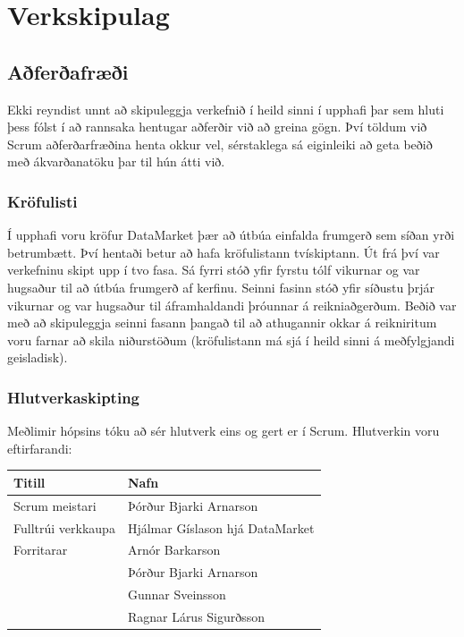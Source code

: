 \documentclass{article}
\begin{document}
\newpage

\section{Verkskipulag}


\subsection{Aðferðafræði}

Ekki reyndist unnt að skipuleggja verkefnið í heild sinni í upphafi þar sem hluti þess fólst í að rannsaka hentugar aðferðir við að greina gögn.
Því töldum við Scrum aðferðarfræðina henta okkur vel, sérstaklega sá eiginleiki að geta beðið með ákvarðanatöku þar til hún átti við.

\subsubsection{Kröfulisti}
Í upphafi voru kröfur DataMarket þær að útbúa einfalda frumgerð sem síðan yrði betrumbætt.
Því hentaði betur að hafa kröfulistann tvískiptann. Út frá því var verkefninu skipt upp í tvo fasa.
Sá fyrri stóð yfir fyrstu tólf vikurnar og var hugsaður til að útbúa frumgerð af kerfinu.
Seinni fasinn stóð yfir síðustu þrjár vikurnar og var hugsaður til áframhaldandi þróunnar á reikniaðgerðum.
Beðið var með að skipuleggja seinni fasann þangað til að athugannir okkar á reikniritum voru farnar að skila niðurstöðum 
(kröfulistann má sjá í heild sinni á meðfylgjandi geisladisk). 


\subsubsection{Hlutverkaskipting}

Meðlimir hópsins tóku að sér hlutverk eins og gert er í Scrum. Hlutverkin voru eftirfarandi:

\vspace{5 mm}
\begin{tabular}{| l | l |}
\hline
Titill & Nafn \\
\hline \hline
Scrum meistari & Þórður Bjarki Arnarson\\
\hline
Fulltrúi verkkaupa & Hjálmar Gíslason hjá DataMarket\\
\hline
Forritarar & Arnór Barkarson \\
	   & Þórður Bjarki Arnarson \\
	   & Gunnar Sveinsson \\
	   & Ragnar Lárus Sigurðsson \\
\hline
\end{tabular}
\vspace{5 mm}
\end{document}

